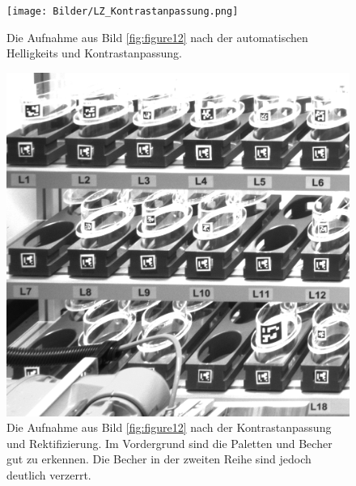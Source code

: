     \begin{figure}
        \caption[Bildaufnahme aus der Lagerzelle nach der Kontrastanpassung.]
        {\small Die Aufnahme aus Bild \ref{fig:figure12} nach der automatischen Helligkeits und Kontrastanpassung.}\label{fig:figure13}
        \texttt{[image: Bilder/LZ\_Kontrastanpassung.png]}
        \centering
    \end{figure}

    \begin{figure}
        \caption[Bild aus der Lagerzelle nach der Rektifizierung und Zuschnitt auf relevanten Regalbereich]
        {\small Die Aufnahme aus Bild \ref{fig:figure12} nach der Kontrastanpassung und Rektifizierung. Im Vordergrund sind die Paletten und Becher gut zu erkennen. Die Becher in der zweiten Reihe sind jedoch deutlich verzerrt.}\label{fig:figure14}
        \includegraphics[width = \textwidth]{Bilder/LZ_transformed.png}
        \centering
    \end{figure}

